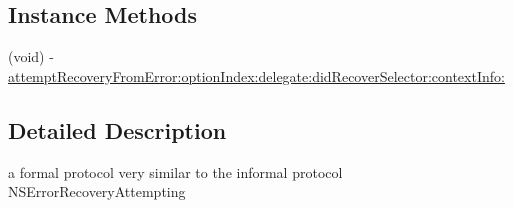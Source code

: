 \subsection*{Instance Methods}
\begin{DoxyCompactItemize}
\item 
(void) -\/ \hyperlink{protocol_f_b_s_d_k_error_recovery_attempting-p_ad30e4446144df6e728789726bc8db056}{attempt\-Recovery\-From\-Error\-:option\-Index\-:delegate\-:did\-Recover\-Selector\-:context\-Info\-:}
\end{DoxyCompactItemize}


\subsection{Detailed Description}
a formal protocol very similar to the informal protocol N\-S\-Error\-Recovery\-Attempting 

